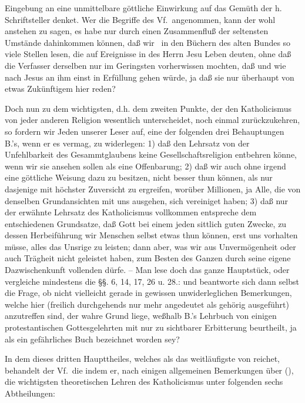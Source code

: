 Eingebung an eine unmittelbare göttliche Einwirkung auf das Gemüth der h. Schriftsteller denket. Wer die Begriffe des Vf.\ angenommen, kann der wohl anstehen zu sagen, es habe nur durch einen Zusammenfluß der seltensten Umstände dahinkommen können, daß wir \zB\ in den Büchern des alten Bundes so viele Stellen lesen, die auf Ereignisse in des Herrn Jesu Leben deuten, ohne daß die Verfasser derselben nur im Geringsten vorherwissen mochten, daß und wie nach Jesus an ihm einst in Erfüllung gehen würde, ja daß sie nur überhaupt von etwas Zukünftigem hier reden? \par
Doch nun zu dem wichtigsten, d.h. dem zweiten Punkte, der den Katholicismus von jeder anderen Religion wesentlich unterscheidet, noch einmal zurückzukehren, so fordern wir Jeden unserer Leser auf, eine der folgenden drei Behauptungen B.'s, wenn er es vermag, zu widerlegen: 1) daß den Lehrsatz von der Unfehlbarkeit des Gesammtglaubens keine Gesellschaftsreligion entbehren könne, wenn wir sie ansehen sollen als eine Offenbarung; 2) daß wir auch ohne irgend eine göttliche Weisung dazu zu besitzen, nicht besser thun können, als nur dasjenige mit höchster Zuversicht zu ergreifen, worüber Millionen, ja Alle, die von denselben Grundansichten mit uns ausgehen, sich vereiniget haben; 3) daß nur der erwähnte Lehrsatz des Katholicismus vollkommen entspreche dem entschiedenen Grundsatze, daß Gott bei einem jeden sittlich guten Zwecke, zu dessen Herbeiführung wir Menschen selbst etwas thun können, erst uns vorhalten müsse, alles das Unsrige zu leisten; dann aber, was wir aus Unvermögenheit oder auch Trägheit nicht geleistet haben, zum Besten des Ganzen durch seine eigene Dazwischenkunft vollenden dürfe. -- Man lese doch das ganze Hauptstück, oder vergleiche mindestens die §§. 6, 14, 17, 26 u. 28.: und beantworte sich dann selbst die Frage, ob nicht vielleicht gerade in gewissen unwiderleglichen Bemerkungen, welche hier (freilich durchgehends nur mehr angedeutet als gehörig ausgeführt) anzutreffen sind, der wahre Grund liege, weßhalb  B.'s Lehrbuch von einigen protestantischen Gottesgelehrten mit nur zu sichtbarer Erbitterung beurtheilt, ja als ein gefährliches Buch bezeichnet worden sey? \par
\gliederungslinie\par
In dem  dieses dritten Haupttheiles, welches als das weitläufigste von  reichet, behandelt der Vf.\ die  indem er, nach einigen allgemeinen Bemerkungen über  (), die wichtigsten theoretischen Lehren des Katholicismus unter folgenden sechs Abtheilungen: \par

